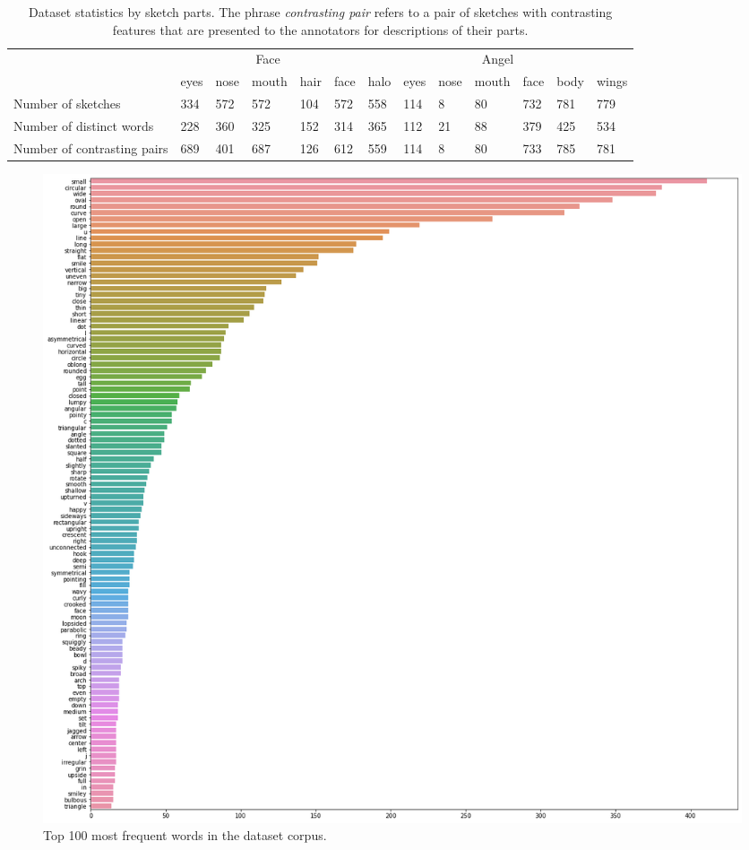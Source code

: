\begin{table}[!htb]
\begin{minipage}{1\textwidth}
\begin{center}
{\small
\begin{tabular}{p{9em} | p{1.5em}p{1.5em}p{2em}p{1.5em}p{1.5em} | p{1.5em}p{1.5em}p{1.5em}p{2em}p{1.5em}p{1.5em}p{1.5em} }
\toprule
~ & \multicolumn{5}{c}{Face} & \multicolumn{7}{c}{Angel}\\
~ & eyes & nose & mouth & hair & face & halo & eyes & nose & mouth & face & body & wings  \\
\midrule
Number of sketches & 
334 & 572 & 572 & 104 & 572 &
558 & 114 & 8 & 80 & 732 & 781 & 779 \\
Number of distinct words & 
228 & 360 & 325 & 152 & 314 & 
365 & 112 & 21 & 88 & 379 & 425 & 534 \\
Number of contrasting pairs &
689 & 401 & 687 & 126 & 612 &
559 & 114 & 8 & 80 & 733 & 785 & 781 \\
\bottomrule
\end{tabular}}
\caption{Dataset statistics by sketch parts. The phrase \textit{contrasting pair} refers to a pair of sketches with contrasting features that are presented to the annotators for descriptions of their parts.}
\label{table:dataset_stats_byparts}
\end{center}
\end{minipage}
\end{table}

\begin{figure}[!htb]
\includegraphics[width=\linewidth]{dataset_image/word_freq_face.png}  
\caption{Top 100 most frequent words in the dataset corpus.}
\label{word_freq}
\end{figure}

